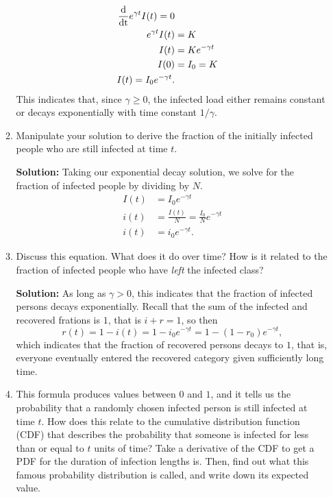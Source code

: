 \documentclass[11pt]{article}
\begin{document}
\begin{enumerate}
\begin{enumerate}[label=\alph*.]
\begin{tcolorbox}[breakable]
\begin{align*}
				\frac{\rm d}{\rm d t}e^{\gamma t}I(t) = 0\\
				e^{\gamma t}I(t) &= K\\
				I(t)&=K e^{-\gamma t}\\
				I(0)&=I_0=K\\
				I(t)=I_0 e^{-\gamma t}.
			\end{align*}
			This indicates that, since $\gamma \geq 0$, the infected load either remains constant or decays exponentially with time constant $1/\gamma$.
		\end{tcolorbox}
		\item Manipulate your solution to derive the fraction of the initially infected people who are still infected at time $t$.
		\begin{tcolorbox}[breakable]
			\textbf{Solution:}
			Taking our exponential decay solution, we solve for the fraction of infected people by dividing by $N$.
			\begin{align*}
				I(t)&=I_0e^{-\gamma t}\\
				i(t)&=\frac{I(t)}{N} = \frac{I_0}{N}e^{-\gamma t}\\
				i(t)&=i_0 e^{-\gamma t}.
			\end{align*}
		\end{tcolorbox}
		\item Discuss this equation. What does it do over time? How is it related to the fraction of infected people who have {\it left} the infected class?
		\begin{tcolorbox}[breakable]
			\textbf{Solution:}
			As long as $\gamma >0$, this indicates that the fraction of infected persons decays exponentially. Recall that the sum of the infected and recovered frations is $1$, that is 
			$i+r=1$, so then 
			\begin{equation*}
				r(t)=1-i(t) = 1-i_0e^{-\gamma t} =1-(1-r_0)e^{-\gamma t},
			\end{equation*}
			which indicates that the fraction of recovered persons decays to $1$, that is, everyone eventually entered the recovered category given sufficiently long time.
		\end{tcolorbox}
		\item This formula produces values between $0$ and $1$, and it tells us the probability that a randomly chosen infected person is still infected at time $t$. How does this relate to the cumulative distribution function (CDF) that describes the probability that someone is infected for less than or equal to $t$ units of time? Take a derivative of the CDF to get a PDF for the duration of infection lengths is. Then, find out what this famous probability distribution is called, and write down its expected value.

\end{enumerate}
\end{enumerate}
\end{document}
